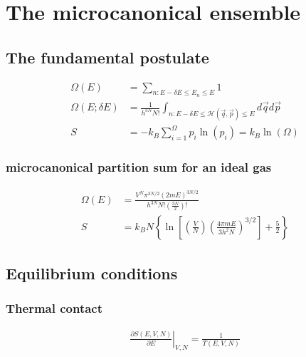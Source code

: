 \section{The microcanonical ensemble}

\subsection*{The fundamental postulate}

\begin{equation*}
    \begin{aligned}
        \Omega(E) &= \sum_{n: E- \delta E \leq E_n \leq E} 1 \\
        \Omega(E; \delta E) &= \frac{1}{h^{3N} N!}  \int_{n: E- \delta E \leq \mathcal{H}(\vec{q}, \vec{p}) \leq E} d \vec{q} d \vec{p} \\
        S &= -k_B \sum_{i=1}^\Omega p_i \ln (p_i) = k_B \ln (\Omega)
    \end{aligned}
\end{equation*}

\subsubsection*{microcanonical partition sum for an ideal gas}

\begin{equation*}
    \begin{aligned}
        \Omega(E) &= \frac{V^N \pi^{3N/2} (2mE)^{3N/2}}{h^{3N}N!\left( \frac{3N}{2} \right)!} \\
        S &= k_B N \left\lbrace \ln \left[ \left( \frac{V}{N} \right) \left( \frac{4 \pi m E}{3 h^2 N} \right)^{3/2} \right] + \frac{5}{2}\right\rbrace
    \end{aligned}
\end{equation*}

\subsection*{Equilibrium conditions}

\subsubsection*{Thermal contact}
\begin{equation*}
    \begin{aligned}
        \left. \frac{\partial S (E,V,N)}{\partial E} \right|_{V,N} = \frac{1}{T(E,V,N)}
    \end{aligned}
\end{equation*}

